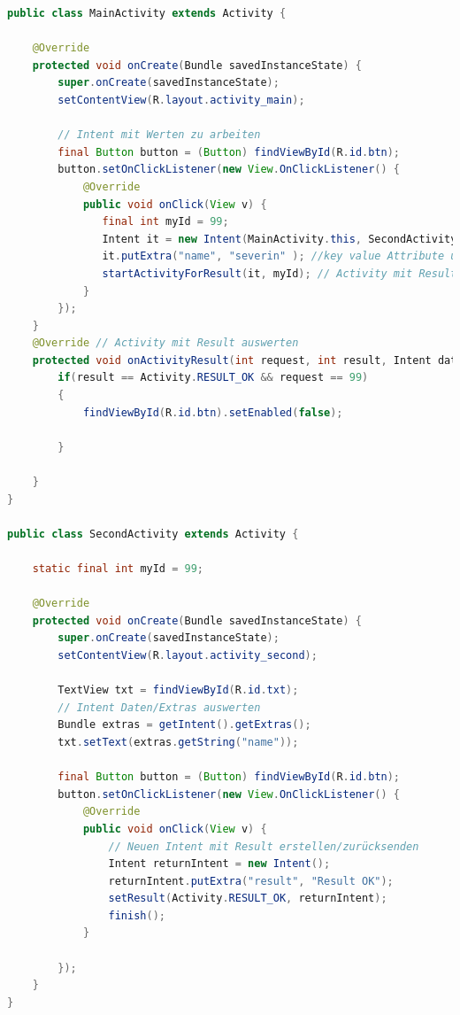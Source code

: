 \begin{lstlisting}[language=java]
public class MainActivity extends Activity {

    @Override
    protected void onCreate(Bundle savedInstanceState) {
        super.onCreate(savedInstanceState);
        setContentView(R.layout.activity_main);

        // Intent mit Werten zu arbeiten
        final Button button = (Button) findViewById(R.id.btn);
        button.setOnClickListener(new View.OnClickListener() {
            @Override
            public void onClick(View v) {
               final int myId = 99;
               Intent it = new Intent(MainActivity.this, SecondActivity.class);
               it.putExtra("name", "severin" ); //key value Attribute uebergeben
               startActivityForResult(it, myId); // Activity mit Result starten
            }
        });
    }
    @Override // Activity mit Result auswerten
    protected void onActivityResult(int request, int result, Intent data) {
        if(result == Activity.RESULT_OK && request == 99)
        {
            findViewById(R.id.btn).setEnabled(false);

        }

    }
}

public class SecondActivity extends Activity {

    static final int myId = 99;

    @Override
    protected void onCreate(Bundle savedInstanceState) {
        super.onCreate(savedInstanceState);
        setContentView(R.layout.activity_second);

        TextView txt = findViewById(R.id.txt);
        // Intent Daten/Extras auswerten
        Bundle extras = getIntent().getExtras(); 
        txt.setText(extras.getString("name"));

        final Button button = (Button) findViewById(R.id.btn);
        button.setOnClickListener(new View.OnClickListener() {
            @Override
            public void onClick(View v) {
                // Neuen Intent mit Result erstellen/zurücksenden
                Intent returnIntent = new Intent();
                returnIntent.putExtra("result", "Result OK");
                setResult(Activity.RESULT_OK, returnIntent);
                finish();
            }

        });
    }
}

\end{lstlisting}



